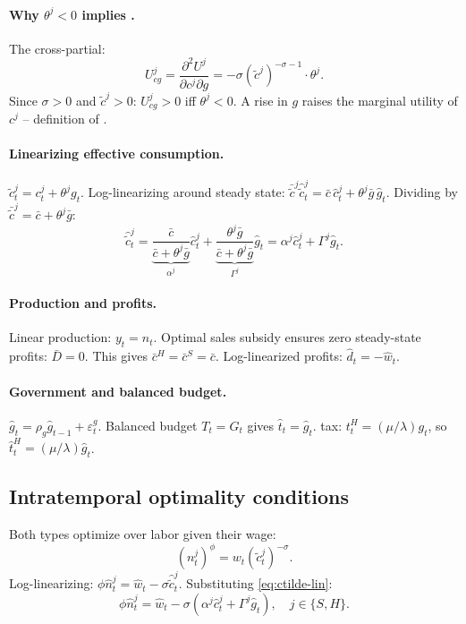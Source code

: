 \paragraph{Why $\theta^{j}<0$ implies \EC{}.}
The cross-partial:
\[
  U_{cg}^{j}=\frac{\partial^{2}U^{j}}{\partial c^{j}\partial g}
    =-\sigma(\tilde c^{j})^{-\sigma-1}\cdot\theta^{j}.
\]
Since $\sigma>0$ and $\tilde c^{j}>0$: $U_{cg}^{j}>0$ iff $\theta^{j}<0$. A
rise in $g$ raises the marginal utility of $c^{j}$ -- definition of \EC{}.

\paragraph{Linearizing effective consumption.}
$\tilde c^{j}_{t}=c^{j}_{t}+\theta^{j}g_{t}$. Log-linearizing around steady state:
$\bar{\tilde c}^{j}\hat{\tilde c}^{j}_{t}=\bar c\,\hat c^{j}_{t}+\theta^{j}\bar g\,\hat g_{t}$.
Dividing by $\bar{\tilde c}^{j}=\bar c+\theta^{j}\bar g$:
\begin{equation}\label{eq:ctilde-lin}
  \hat{\tilde c}^{j}_{t}=\underbrace{\frac{\bar c}{\bar c+\theta^{j}\bar g}}_{\alpha^{j}}\hat c^{j}_{t}
    +\underbrace{\frac{\theta^{j}\bar g}{\bar c+\theta^{j}\bar g}}_{\Gamma^{j}}\hat g_{t}
  =\alpha^{j}\hat c^{j}_{t}+\Gamma^{j}\hat g_{t}.
\end{equation}

\paragraph{Production and profits.}
Linear production: $y_{t}=n_{t}$. Optimal sales subsidy ensures zero steady-state
profits: $\bar D=0$. This gives $\bar c^{H}=\bar c^{S}=\bar c$. Log-linearized
profits: $\hat d_{t}=-\hat w_{t}$.

\paragraph{Government and balanced budget.}
$\hat g_{t}=\rho_{g}\hat g_{t-1}+\varepsilon^{g}_{t}$. Balanced budget $T_{t}=G_{t}$
gives $\hat t_{t}=\hat g_{t}$. \HtM{} tax: $t^{H}_{t}=(\mu/\lambda)g_{t}$, so
$\hat t^{H}_{t}=(\mu/\lambda)\hat g_{t}$.

\subsection{Intratemporal optimality conditions}\label{app:intratemp}
Both types optimize over labor given their wage:
\begin{equation}\label{eq:A-foc-labor}
  (n^{j}_{t})^{\phi}=w_{t}(\tilde c^{j}_{t})^{-\sigma}.
\end{equation}
Log-linearizing: $\phi\hat n^{j}_{t}=\hat w_{t}-\sigma\hat{\tilde c}^{j}_{t}$.
Substituting \eqref{eq:ctilde-lin}:
\begin{equation}\label{eq:A-intra}
  \phi\hat n^{j}_{t}=\hat w_{t}-\sigma(\alpha^{j}\hat c^{j}_{t}+\Gamma^{j}\hat g_{t}),
  \quad j\in\{S,H\}.
\end{equation}

